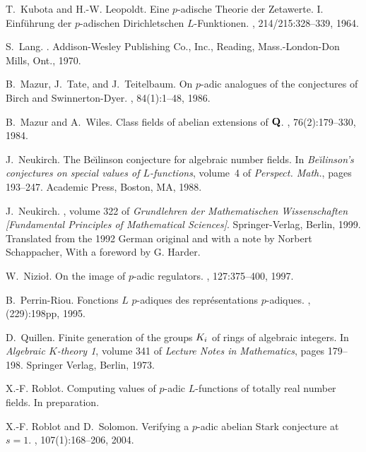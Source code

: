 \documentclass{amsart}
\begin{document}
\begin{thebibliography}{10}
T.~Kubota and H.-W. Leopoldt.
\newblock Eine {$p$}-adische {T}heorie der {Z}etawerte. {I}. {E}inf\"uhrung der
  {$p$}-adischen {D}irichletschen {$L$}-{F}unktionen.
, 214/215:328--339, 1964.

S.~Lang.
.
\newblock Addison-Wesley Publishing Co., Inc., Reading, Mass.-London-Don Mills,
  Ont., 1970.

B.~Mazur, J.~Tate, and J.~Teitelbaum.
\newblock On {$p$}-adic analogues of the conjectures of {B}irch and
{S}winnerton-{D}yer.
, 84(1):1--48, 1986.

B.~Mazur and A.~Wiles.
\newblock Class fields of abelian extensions of {${\bf Q}$}.
, 76(2):179--330, 1984.
		
J.~Neukirch.
\newblock The {B}e\u\i linson conjecture for algebraic number fields.
\newblock In {\em Be\u\i linson's conjectures on special values of
  $L$-functions}, volume~4 of {\em Perspect. Math.}, pages 193--247. Academic
  Press, Boston, MA, 1988.

J.~Neukirch.
, volume 322 of {\em Grundlehren der
  Mathematischen Wissenschaften [Fundamental Principles of Mathematical
  Sciences]}.
\newblock Springer-Verlag, Berlin, 1999.
\newblock Translated from the 1992 German original and with a note by Norbert
  Schappacher, With a foreword by G. Harder.

W.~Nizio\l.
\newblock On the image of $p$-adic regulators.
, 127:375--400, 1997.

B.~Perrin-Riou.
\newblock Fonctions ${L}$ $p$-adiques des repr\'esentations $p$-adiques.
, (229):198pp, 1995.

D.~Quillen.
\newblock Finite generation of the groups ${K}\sb{i}$ of rings of algebraic
  integers.
\newblock In {\em Algebraic ${K}$-theory {1}}, volume 341 of {\em Lecture
  {N}otes in {M}athematics}, pages 179--198. Springer {V}erlag, Berlin, 1973.

X.-F. Roblot.
\newblock Computing values of {$p$}-adic {$L$}-functions of totally real number
  fields.
\newblock In preparation.

X.-F. Roblot and D.~Solomon.
\newblock Verifying a {$p$}-adic abelian {S}tark conjecture at {$s=1$}.
, 107(1):168--206, 2004.


\end{thebibliography}
\end{document}
